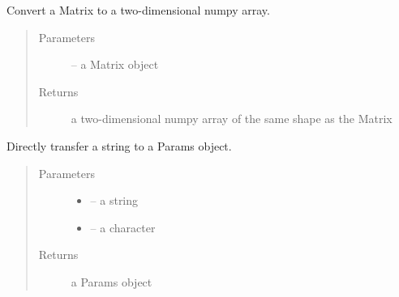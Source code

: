 \documentclass[letterpaper,10pt,english]{sphinxmanual}
\begin{document}

\begin{fulllineitems}
\label{\detokenize{index:dbm_py.interface.float_matrix_to_np2darray}}
Convert a Matrix to a two-dimensional numpy array.
\begin{quote}\begin{description}
\item[{Parameters}] \leavevmode
{} -- a Matrix object

\item[{Returns}] \leavevmode
a two-dimensional numpy array of the same shape as the Matrix

\end{description}\end{quote}

\end{fulllineitems}


\begin{fulllineitems}
\label{\detokenize{index:dbm_py.interface.string_to_params}}
Directly transfer a string to a Params object.
\begin{quote}\begin{description}
\item[{Parameters}] \leavevmode\begin{itemize}
\item {} 
 -- a string

\item {} 
 -- a character

\end{itemize}

\item[{Returns}] \leavevmode
a Params object

\end{description}\end{quote}

\end{fulllineitems}




\renewcommand{\indexname}{Index}
\printindex
\end{document}
